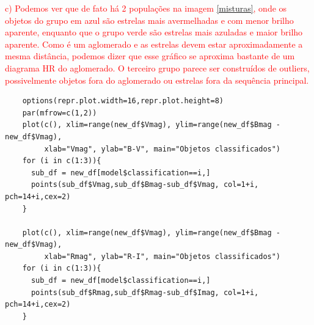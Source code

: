 \textcolor{red}{c) Podemos ver que de fato há 2 populações na imagem \ref{misturas}, onde os objetos do grupo em azul são estrelas mais avermelhadas e com menor brilho aparente, enquanto que o grupo verde são estrelas mais azuladas e maior brilho aparente. Como é um aglomerado e as estrelas devem estar aproximadamente a mesma distância, podemos dizer que esse gráfico se aproxima bastante de um diagrama HR do aglomerado. O terceiro grupo parece ser construídos de outliers, possivelmente objetos fora do aglomerado ou estrelas fora da sequência principal.}

\begin{lstlisting}
    options(repr.plot.width=16,repr.plot.height=8)
    par(mfrow=c(1,2))
    plot(c(), xlim=range(new_df$Vmag), ylim=range(new_df$Bmag - new_df$Vmag),
         xlab="Vmag", ylab="B-V", main="Objetos classificados")
    for (i in c(1:3)){
      sub_df = new_df[model$classification==i,]
      points(sub_df$Vmag,sub_df$Bmag-sub_df$Vmag, col=1+i, pch=14+i,cex=2)
    }
    
    plot(c(), xlim=range(new_df$Vmag), ylim=range(new_df$Bmag - new_df$Vmag),
         xlab="Rmag", ylab="R-I", main="Objetos classificados")
    for (i in c(1:3)){
      sub_df = new_df[model$classification==i,]
      points(sub_df$Rmag,sub_df$Rmag-sub_df$Imag, col=1+i, pch=14+i,cex=2)
    }
\end{lstlisting}


